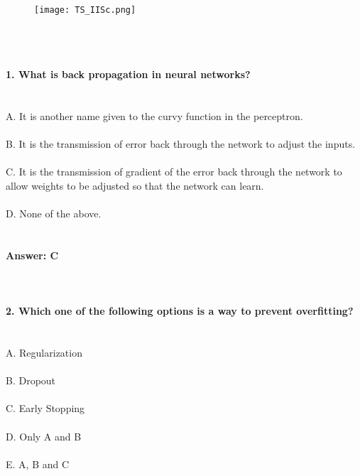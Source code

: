 \documentclass[prl,twocolumn,showpacs,preprintnumbers,superscriptaddress]{revtex4}
\theoremstyle{plain}
\theoremstyle{definition}
\begin{document}
\begin{widetext}
\\
\\
\\

\begin{wrapfigure}
\centering
\end{wrapfigure}
\begin{figure}[h!]
 \begin{right}
  \hfill\texttt{[image: TS\_IISc.png]}
 \end{right}
\end{figure}
\\
\\
\\
\noindent\textbf{1. What is back propagation in neural networks?}
\\
\\
\\
A. It is another name given to the curvy function in the perceptron.
\\
\\
B. It is the transmission of error back through the network to adjust the inputs.
\\
\\
C. It is the transmission of gradient of the error back through the network to allow weights to be adjusted so that the network can learn.
\\
\\
D. None of the above.
\\
\\
\\
\textbf{Answer: C}
\\
\\
\\
\\
\textbf{2. Which one of the following options is a way to prevent overfitting?}
\\
\\
\\
A. Regularization
\\
\\
B. Dropout
\\
\\
C. Early Stopping
\\
\\
D. Only A and B
\\
\\
E. A, B and C
\\
\\

\end{widetext}
\end{document}
